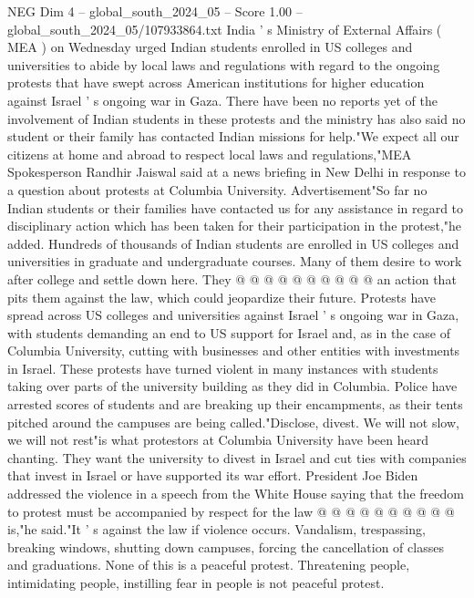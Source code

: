 \begin{textsample}{NEG Dim 4 – global\_south\_2024\_05 – Score 1.00 – global\_south\_2024\_05/107933864.txt}  \label{ex:f4_neg_259}
India ' s Ministry of External Affairs ( MEA ) on Wednesday urged Indian students enrolled in US colleges and universities to abide by local laws and regulations with regard to the ongoing protests that have swept across American institutions for higher education against Israel ' s ongoing war in Gaza.
There have been no reports yet of the involvement of Indian students in these protests and the ministry has also said no student or their family has contacted Indian missions for help."We expect all our citizens at home and abroad to respect local laws and regulations,"MEA Spokesperson Randhir Jaiswal said at a news briefing in New Delhi in response to a question about protests at Columbia University.
Advertisement"So far no Indian students or their families have contacted us for any assistance in regard to disciplinary action which has been taken for their participation in the protest,"he added.
Hundreds of thousands of Indian students are enrolled in US colleges and universities in graduate and undergraduate courses.
Many of them desire to work after college and settle down here.
They @ @ @ @ @ @ @ @ @ @ an action that pits them against the law, which could jeopardize their future.
Protests have spread across US colleges and universities against Israel ' s ongoing war in Gaza, with students demanding an end to US support for Israel and, as in the case of Columbia University, cutting with businesses and other entities with investments in Israel.
These protests have turned violent in many instances with students taking over parts of the university building as they did in Columbia.
Police have arrested scores of students and are breaking up their encampments, as their tents pitched around the campuses are being called."Disclose, divest.
We will not slow, we will not rest"is what protestors at Columbia University have been heard chanting.
They want the university to divest in Israel and cut ties with companies that invest in Israel or have supported its war effort.
President Joe Biden addressed the violence in a speech from the White House saying that the freedom to protest must be accompanied by respect for the law @ @ @ @ @ @ @ @ @ @ is,"he said."It ' s against the law if violence occurs.
Vandalism, trespassing, breaking windows, shutting down campuses, forcing the cancellation of classes and graduations.
None of this is a peaceful protest.
Threatening people, intimidating people, instilling fear in people is not peaceful protest.

\end{textsample}
